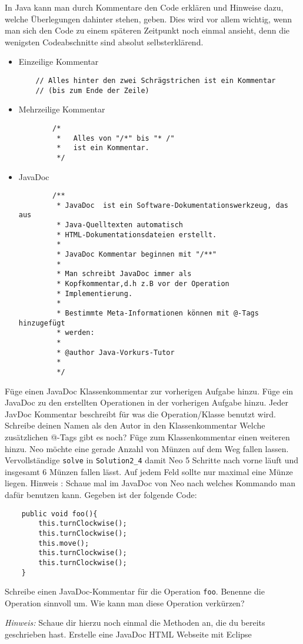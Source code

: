     In Java kann  man durch Kommentare den Code  erklären und Hinweise dazu, welche Überlegungen dahinter stehen, geben. Dies wird vor allem wichtig, wenn man sich den Code zu einem späteren Zeitpunkt noch einmal ansieht, denn die wenigsten Codeabschnitte sind absolut selbsterklärend.
    \begin{itemize}
        \item Einzeilige Kommentar
    \begin{lstlisting}
    // Alles hinter den zwei Schrägstrichen ist ein Kommentar
    // (bis zum Ende der Zeile)
    \end{lstlisting}
        \item Mehrzeilige Kommentar
        \begin{lstlisting}
        /*
         *   Alles von "/*" bis "* /"
         *   ist ein Kommentar.
         */
    \end{lstlisting}
        \item JavaDoc
        \begin{lstlisting}
        /**
         * JavaDoc  ist ein Software-Dokumentationswerkzeug, das aus
         * Java-Quelltexten automatisch
         * HTML-Dokumentationsdateien erstellt.
         *
         * JavaDoc Kommentar beginnen mit "/**"
         *
         * Man schreibt JavaDoc immer als
         * Kopfkommentar,d.h z.B vor der Operation
         * Implementierung.
         *
         * Bestimmte Meta-Informationen können mit @-Tags hinzugefügt
         * werden:
         *
         * @author Java-Vorkurs-Tutor
         *
         */
    \end{lstlisting}
    \end{itemize}
        \subexcercise Füge einen JavaDoc Klassenkommentar zur vorherigen Aufgabe hinzu. Füge ein JavaDoc zu den erstellten Operationen in der vorherigen Aufgabe hinzu. Jeder JavDoc Kommentar beschreibt für was die Operation/Klasse benutzt wird.
    \subexcercise Schreibe deinen Namen als den Autor in den Klassenkommentar
    \subexcercise Welche zusätzlichen @-Tags gibt es noch? Füge zum Klassenkommentar einen weiteren hinzu.
    \subexcercise Neo möchte eine gerade Anzahl von Münzen auf dem Weg fallen lassen. Vervollständige \texttt{solve} in \texttt{Solution2\_4} damit Neo 5 Schritte nach vorne läuft und insgesamt 6 Münzen fallen lässt.
    Auf jedem Feld sollte nur maximal eine Münze liegen.
    \newline Hinweis : Schaue mal im JavaDoc von Neo nach welches Kommando man dafür benutzen kann.
    Gegeben ist der folgende Code:
    \begin{lstlisting}
    public void foo(){
        this.turnClockwise();
        this.turnClockwise();
        this.move();
        this.turnClockwise();
        this.turnClockwise();
    }
    \end{lstlisting}
    \subexcercise Schreibe einen JavaDoc-Kommentar für die Operation \texttt{foo}.
    \subexcercise Benenne die Operation sinnvoll um. Wie kann man diese Operation verkürzen?

    \emph{Hinweis:} Schaue dir hierzu noch einmal die Methoden an, die du bereits geschrieben hast.
    \subexcercise Erstelle eine JavaDoc HTML Webseite mit Eclipse
